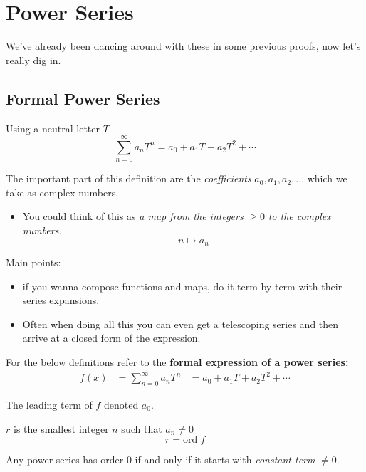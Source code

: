 \chapter{Power Series}
We've already been dancing around with these in some previous proofs, now let's really dig in. 
\section{Formal Power Series}
\begin{defn}
  Using a neutral letter $T$
  \[\sum_{n = 0}^{\infty}a_n T^n = a_0 + a_1 T + a_2 T^2 + \cdots \]
\end{defn}
The important part of this definition are the \textit{coefficients} $a_0, a_1, a_2, ...$ which we 
take as complex numbers.
\begin{itemize}
  \item You could think of this as \textit{a map from the integers} $ \geq 0 $ \textit{to the complex numbers.}
  \[n \mapsto a_n \]
\end{itemize}

Main points: 
  \begin{itemize}
    \item if you wanna compose functions and maps, do it term by term with their series expansions.
    \item Often when doing all this you can even get a telescoping series and then arrive at a closed form of the expression. 
  \end{itemize}

For the below definitions refer to the \textbf{formal expression of a power series:}
\begin{align*}
  f(x) &= \sum_{n = 0}^{\infty} a_n T^n 
  &= a_0 + a_1 T + a_2 T^2 + \cdots
\end{align*}
\begin{defn}
  The leading term of $f$ denoted $a_0$.
\end{defn}

\begin{defn}
  $r$ is the smallest integer $n$ such that $a_n \not = 0$
  \[r = \text{ord}\; f\]
\end{defn}

\begin{thm}
  Any power series has order $0$ if and only if it starts with \textit{constant term} $\not = 0.$
\end{thm}

